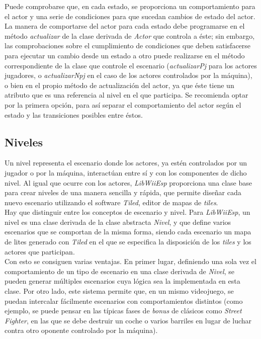 Puede comprobarse que, en cada estado, se proporciona un comportamiento para el actor y una serie de condiciones para que sucedan cambios de estado del actor. La manera de comportarse del actor para cada estado debe programarse en el método \emph{actualizar} de la clase derivada de \emph{Actor} que controla a éste; sin embargo, las comprobaciones sobre el cumplimiento de condiciones que deben satisfacerse para ejecutar un cambio desde un estado a otro puede realizarse en el método correspondiente de la clase que controle el escenario (\emph{actualizarPj} para los actores jugadores, o \emph{actualizarNpj} en el caso de los actores controlados por la máquina), o bien en el propio método de actualización del actor, ya que éste tiene un atributo que es una referencia al nivel en el que participa. Se recomienda optar por la primera opción, para así separar el comportamiento del actor según el estado y las transiciones posibles entre éstos.

\subsection{Niveles}

Un nivel representa el escenario donde los actores, ya estén controlados por un jugador o por la máquina, interactúan entre sí y con los componentes de dicho nivel. Al igual que ocurre con los actores, \emph{LibWiiEsp} proporciona una clase base para crear niveles de una manera sencilla y rápida, que permite diseñar cada nuevo escenario utilizando el software \emph{Tiled}, editor de mapas de \emph{tiles}.\\

Hay que distinguir entre los conceptos de escenario y nivel. Para \emph{LibWiiEsp}, un nivel es una clase derivada de la clase abstracta \emph{Nivel}, y que define varios escenarios que se comportan de la misma forma, siendo cada escenario un mapa de lites generado con \emph{Tiled} en el que se especifica la disposición de los \emph{tiles} y los actores que participan.\\

Con esto se consiguen varias ventajas. En primer lugar, definiendo una sola vez el comportamiento de un tipo de escenario en una clase derivada de \emph{Nivel}, se pueden generar múltiples escenarios cuya lógica sea la implementada en esta clase. Por otro lado, este sistema permite que, en un mismo videojuego, se puedan intercalar fácilmente escenarios con comportamientos distintos (como ejemplo, se puede pensar en las típicas fases de \emph{bonus} de clásicos como \emph{Street Fighter}, en las que se debe destruir un coche o varios barriles en lugar de luchar contra otro oponente controlado por la máquina).


